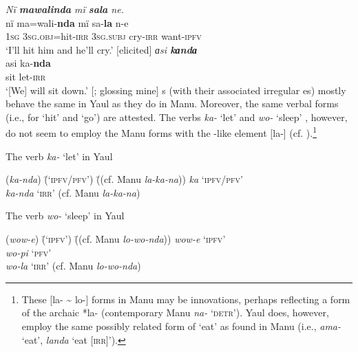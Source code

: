 \ea%
    \label{ex:mdy:8}
            \textit{Nï \textbf{mawalinda} mï \textbf{sala} ne.}\\
    \gll nï    ma=wali-\textbf{nda}    mï      sa-\textbf{la}  n-e\\
    1\textsc{sg}  3\textsc{sg.obj}=hit-\textsc{irr}  3\textsc{sg.subj}  cry-\textsc{irr}  want-\textsc{ipfv}\\
    \glt ‘I’ll hit him and he’ll cry.’ [elicited]
\z
\ea%
    \label{ex:mdy:9}
            \textit{ɑsi \textbf{kɑndɑ}}\\
    \gll asi  ka-\textbf{nda}\\
    sit  let-\textsc{irr}\\
    \glt ‘[We] will sit down.’ [\citep[3256]{Laycock1971a}; glossing mine]
\z
{}s (with their associated irregular  es) mostly behave the same in Yaul as they do in Manu. Moreover, the same  verbal forms (i.e., for ‘hit’ and ‘go’) are attested. The verbs \textit{ka-} ‘let’  and \textit{wo-} ‘sleep’ , however, do not seem to employ the Manu  forms with the -like element [la-] (cf. ).\footnote{These [la- {\textasciitilde} lo-] forms in Manu may be innovations, perhaps reflecting a  form of the archaic   *la- (contemporary Manu \textit{na-} ‘\textsc{detr}’). Yaul does, however, employ the same possibly related  form of ‘eat’ as found in Manu (i.e., \textit{ama-} ‘eat’, \textit{landa} ‘eat [\textsc{irr]}’).}

\ea%
    \label{ex:mdy:9a}
The verb \textit{ka-} ‘let’ in Yaul\\
\begin{tabbing}
{(\textit{ka-nda})} \= {(‘\textsc{ipfv/pfv}’)} \= {((cf. Manu \textit{la-ka-na}))}\kill
{\textit{ka}} \> {‘\textsc{ipfv/pfv}’} \> { }\\
{\textit{ka-nda}} \> {‘\textsc{irr}’} \> {(cf. Manu \textit{la-ka-na})}
\end{tabbing}
\z

\ea%
    \label{ex:mdy:9b}
The verb \textit{wo-} ‘sleep’ in Yaul\\
\begin{tabbing}
{(\textit{wow-e})} \= {(‘\textsc{ipfv}’)} \= {((cf. Manu \textit{lo-wo-nda}))}\kill
{\textit{wow-e}} \> {‘\textsc{ipfv}’} \> { }\\
{\textit{wo-pi}} \> {‘\textsc{pfv}’} \> { }\\
{\textit{wo-la}} \> {‘\textsc{irr}’} \> {(cf. Manu \textit{lo-wo-nda})}
\end{tabbing}
\z

